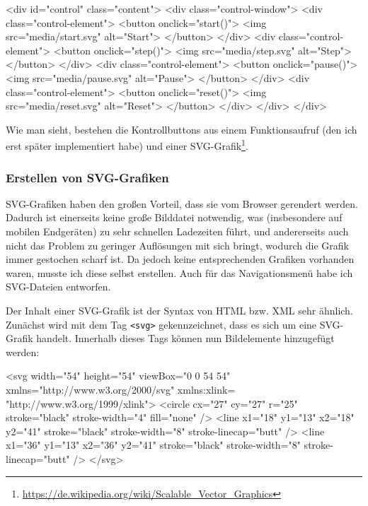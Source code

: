 \documentclass[xcolor=dvipsnames,11pt,paper=a4paper]{report}
\begin{document}
\begin{code}[language=html, caption={Struktur der Kontrollseite}]
<div id="control" class="content">
	<div class="control-window">
		<div class="control-element">
			<button onclick="start()">
				<img src="media/start.svg" alt="Start">
			</button>
		</div>
		<div class="control-element">
			<button onclick="step()">
				<img src="media/step.svg" alt="Step">
			</button>
		</div>
		<div class="control-element">
			<button onclick="pause()">
				<img src="media/pause.svg" alt="Pause">
			</button>
		</div>
		<div class="control-element">
			<button onclick="reset()">
				<img src="media/reset.svg" alt="Reset">
			</button>
		</div>
	</div>
</div>
\end{code}

Wie man sieht, bestehen die Kontrollbuttons aus einem Funktionsaufruf (den ich erst
später implementiert habe) und einer SVG-Grafik\footnote{\url{https://de.wikipedia.org/wiki/Scalable\_Vector\_Graphics}}.

\subsubsection{Erstellen von SVG-Grafiken}

SVG-Grafiken haben den großen Vorteil, dass sie vom Browser gerendert werden. Dadurch
ist einerseits keine große Bilddatei notwendig, was (insbesondere auf mobilen Endgeräten)
zu sehr schnellen Ladezeiten führt, und andererseits auch nicht das Problem zu geringer
Auflösungen mit sich bringt, wodurch die Grafik immer gestochen scharf ist. Da jedoch
keine entsprechenden Grafiken vorhanden waren, musste ich diese selbst erstellen.
Auch für das Navigationsmenü habe ich SVG-Dateien entworfen.

Der Inhalt einer SVG-Grafik ist der Syntax von HTML bzw. XML sehr ähnlich. Zunächst
wird mit dem Tag \texttt{<svg>} gekennzeichnet, dass es sich um eine SVG-Grafik
handelt. Innerhalb dieses Tags können nun Bildelemente hinzugefügt werden:

\begin{code}[language=svg, caption={Bildelemente in einer SVG-Grafik}]
<svg width="54" height="54" viewBox="0 0 54 54" xmlns="http://www.w3.org/2000/svg" xmlns:xlink= "http://www.w3.org/1999/xlink">
	<circle
		cx="27" cy="27" r="25"
		stroke="black" stroke-width="4" fill="none"
	/>
	<line
		x1="18" y1="13"
		x2="18" y2="41"
		stroke="black" stroke-width="8" stroke-linecap="butt"
	/>
	<line
		x1="36" y1="13"
		x2="36" y2="41"
		stroke="black" stroke-width="8" stroke-linecap="butt"
	/>
</svg>
\end{code}
\end{document}

